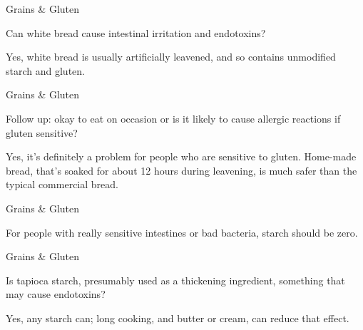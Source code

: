 \documentclass[11pt,oneside,openany,extrafontsizes]{memoir}
\begin{document}
\begin{qaexchange}{Grains \& Gluten}

    \begin{question}
        Can white bread cause intestinal irritation and endotoxins?
    \end{question}

    \begin{answer}
        Yes, white bread is usually artificially leavened, and so contains unmodified starch and gluten.
    \end{answer}
\end{qaexchange}

\begin{qaexchange}{Grains \& Gluten}

    \begin{question}
        Follow up: okay to eat on occasion or is it likely to cause allergic reactions if gluten sensitive?
    \end{question}

    \begin{answer}
        Yes, it's definitely a problem for people who are sensitive to gluten. Home-made bread, that's soaked for about 12 hours during leavening, is much safer than the typical commercial bread.
    \end{answer}
\end{qaexchange}

\begin{standalonequote}{Grains \& Gluten}

    \begin{answer}
        For people with really sensitive intestines or bad bacteria, starch should be zero.
    \end{answer}
\end{standalonequote}

\begin{qaexchange}{Grains \& Gluten}

    \begin{question}
        Is tapioca starch, presumably used as a thickening ingredient, something that may cause endotoxins?
    \end{question}

    \begin{answer}
      Yes, any starch can; long cooking, and butter or cream, can reduce that effect.
    \end{answer}
\end{qaexchange}
\end{document}
